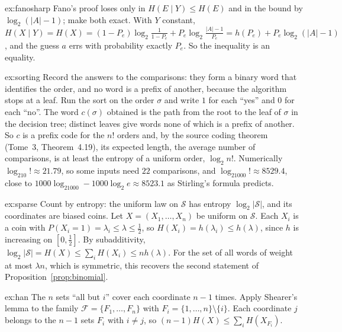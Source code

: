 \begin{solution}{ex:fanosharp}
\idea Fano's proof loses only in $H(E\mid Y)\le H(E)$ and in the bound by $\log_2(|A|-1)$; make both exact.
\writeup With $Y$ constant, $H(X\mid Y)=H(X)=(1-P_e)\log_2\frac1{1-P_e}+P_e\log_2\frac{|A|-1}{P_e}=h(P_e)+P_e\log_2(|A|-1)$, and the guess $a$ errs with probability exactly $P_e$. So the inequality is an equality.
\end{solution}

\begin{solution}{ex:sorting}
\idea Record the answers to the comparisons: they form a binary word that identifies the order, and no word is a prefix of another, because the algorithm stops at a leaf.
\writeup Run the sort on the order $\sigma$ and write $1$ for each ``yes'' and $0$ for each ``no''. The word $c(\sigma)$ obtained is the path from the root to the leaf of $\sigma$ in the decision tree; distinct leaves give words none of which is a prefix of another. So $c$ is a prefix code for the $n!$ orders and, by the source coding theorem (Tome~3, Theorem~4.19), its expected length, the average number of comparisons, is at least the entropy of a uniform order, $\log_2n!$. Numerically $\log_210!\approx21.79$, so some inputs need $22$ comparisons, and $\log_21000!\approx8529.4$, close to $1000\log_21000-1000\log_2e\approx8523.1$ as Stirling's formula predicts.
\end{solution}

\begin{solution}{ex:sparse}
\idea Count by entropy: the uniform law on $\mathcal S$ has entropy $\log_2|\mathcal S|$, and its coordinates are biased coins.
\writeup Let $X=(X_1,\dots,X_n)$ be uniform on $\mathcal S$. Each $X_i$ is a coin with $P(X_i=1)=\lambda_i\le\lambda\le\frac12$, so $H(X_i)=h(\lambda_i)\le h(\lambda)$, since $h$ is increasing on $[0,\frac12]$. By subadditivity, $\log_2|\mathcal S|=H(X)\le\sum_iH(X_i)\le nh(\lambda)$. For the set of all words of weight at most $\lambda n$, which is symmetric, this recovers the second statement of Proposition~\ref{prop:binomial}.
\end{solution}

\begin{solution}{ex:han}
\idea The $n$ sets ``all but $i$'' cover each coordinate $n-1$ times.
\writeup Apply Shearer's lemma to the family $\mathcal F=\{F_1,\dots,F_n\}$ with $F_i=\{1,\dots,n\}\setminus\{i\}$. Each coordinate $j$ belongs to the $n-1$ sets $F_i$ with $i\ne j$, so $(n-1)H(X)\le\sum_iH(X_{F_i})$.
\end{solution}

